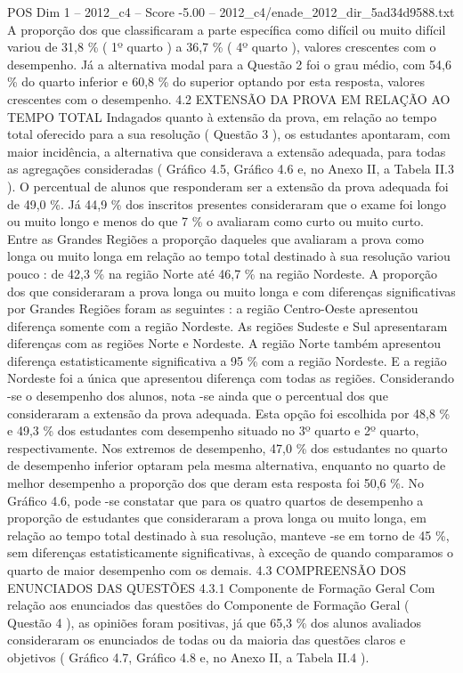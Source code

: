 \begin{textsample}{POS Dim 1 – 2012\_c4 – Score -5.00 – 2012\_c4/enade\_2012\_dir\_5ad34d9588.txt}
A proporção dos que classificaram a parte específica como difícil ou muito difícil variou de 31,8 \% ( 1º quarto ) a 36,7 \% ( 4º quarto ), valores crescentes com o desempenho.
Já a alternativa modal para a Questão 2 foi o grau médio, com 54,6 \% do quarto inferior e 60,8 \% do superior optando por esta resposta, valores crescentes com o desempenho. 4.2 EXTENSÃO DA PROVA EM RELAÇÃO AO TEMPO TOTAL Indagados quanto à extensão da prova, em relação ao tempo total oferecido para a sua resolução ( Questão 3 ), os estudantes apontaram, com maior incidência, a alternativa que considerava a extensão adequada, para todas as agregações consideradas ( Gráfico 4.5, Gráfico 4.6 e, no Anexo II, a Tabela II.3 ).
O percentual de alunos que responderam ser a extensão da prova adequada foi de 49,0 \%.
Já 44,9 \% dos inscritos presentes consideraram que o exame foi longo ou muito longo e menos do que 7 \% o avaliaram como curto ou muito curto.
Entre as Grandes Regiões a proporção daqueles que avaliaram a prova como longa ou muito longa em relação ao tempo total destinado à sua resolução variou pouco : de 42,3 \% na região Norte até 46,7 \% na região Nordeste.
A proporção dos que consideraram a prova longa ou muito longa e com diferenças significativas por Grandes Regiões foram as seguintes : a região Centro-Oeste apresentou diferença somente com a região Nordeste.
As regiões Sudeste e Sul apresentaram diferenças com as regiões Norte e Nordeste.
A região Norte também apresentou diferença estatisticamente significativa a 95 \% com a região Nordeste.
E a região Nordeste foi a única que apresentou diferença com todas as regiões.
Considerando -se o desempenho dos alunos, nota -se ainda que o percentual dos que consideraram a extensão da prova adequada.
Esta opção foi escolhida por 48,8 \% e 49,3 \% dos estudantes com desempenho situado no 3º quarto e 2º quarto, respectivamente.
Nos extremos de desempenho, 47,0 \% dos estudantes no quarto de desempenho inferior optaram pela mesma alternativa, enquanto no quarto de melhor desempenho a proporção dos que deram esta resposta foi 50,6 \%.
No Gráfico 4.6, pode -se constatar que para os quatro quartos de desempenho a proporção de estudantes que consideraram a prova longa ou muito longa, em relação ao tempo total destinado à sua resolução, manteve -se em torno de 45 \%, sem diferenças estatisticamente significativas, à exceção de quando comparamos o quarto de maior desempenho com os demais. 4.3 COMPREENSÃO DOS ENUNCIADOS DAS QUESTÕES 4.3.1 Componente de Formação Geral Com relação aos enunciados das questões do Componente de Formação Geral ( Questão 4 ), as opiniões foram positivas, já que 65,3 \% dos alunos avaliados consideraram os enunciados de todas ou da maioria das questões claros e objetivos ( Gráfico 4.7, Gráfico 4.8 e, no Anexo II, a Tabela II.4 ).

\end{textsample}
